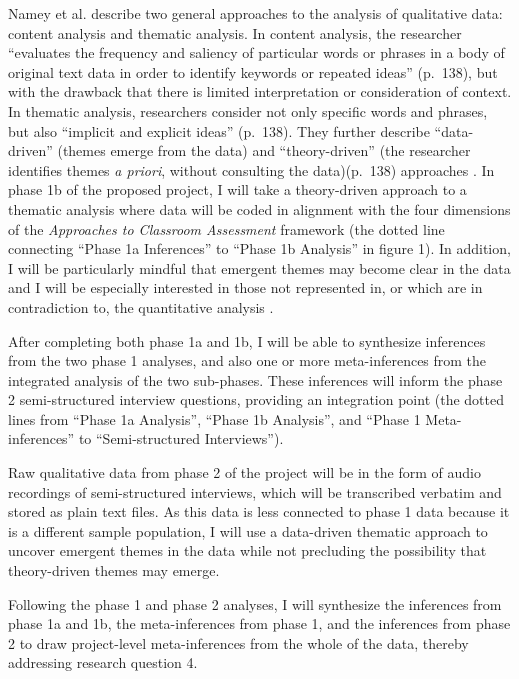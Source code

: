 \documentclass[
]{book}
\begin{document}
Namey et al. \citeyearpar{nameyDataReductionTechniques2008} describe two general approaches to the analysis of qualitative data: content analysis and thematic analysis. In content analysis, the researcher ``evaluates the frequency and saliency of particular words or phrases in a body of original text data in order to identify keywords or repeated ideas'' (p.~138), but with the drawback that there is limited interpretation or consideration of context. In thematic analysis, researchers consider not only specific words and phrases, but also ``implicit and explicit ideas'' (p.~138). They further describe ``data-driven'' (themes emerge from the data) and ``theory-driven'' (the researcher identifies themes \emph{a priori}, without consulting the data)(p.~138) approaches \citep[see also:][]{tashakkoriFoundationsMixedMethods2020}. In phase 1b of the proposed project, I will take a theory-driven approach to a thematic analysis where data will be coded in alignment with the four dimensions of the \emph{Approaches to Classroom Assessment} framework \citep{delucaTeachersApproachesClassroom2016} (the dotted line connecting ``Phase 1a Inferences'' to ``Phase 1b Analysis'' in figure 1). In addition, I will be particularly mindful that emergent themes may become clear in the data and I will be especially interested in those not represented in, or which are in contradiction to, the quantitative analysis \citep{tashakkoriFoundationsMixedMethods2020}.

After completing both phase 1a and 1b, I will be able to synthesize inferences from the two phase 1 analyses, and also one or more meta-inferences from the integrated analysis of the two sub-phases. These inferences will inform the phase 2 semi-structured interview questions, providing an integration point (the dotted lines from ``Phase 1a Analysis'', ``Phase 1b Analysis'', and ``Phase 1 Meta-inferences'' to ``Semi-structured Interviews'').

Raw qualitative data from phase 2 of the project will be in the form of audio recordings of semi-structured interviews, which will be transcribed verbatim and stored as plain text files. As this data is less connected to phase 1 data because it is a different sample population, I will use a data-driven thematic approach to uncover emergent themes in the data while not precluding the possibility that theory-driven themes may emerge.

Following the phase 1 and phase 2 analyses, I will synthesize the inferences from phase 1a and 1b, the meta-inferences from phase 1, and the inferences from phase 2 to draw project-level meta-inferences from the whole of the data, thereby addressing research question 4.
\end{document}
